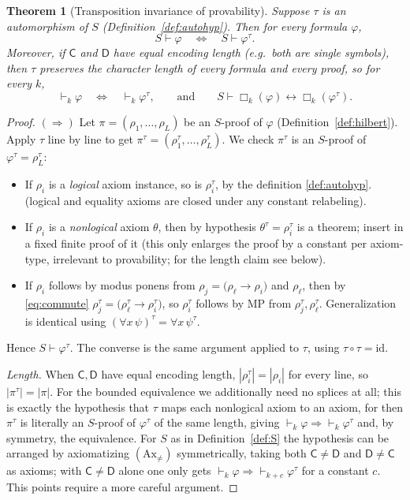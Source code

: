 \documentclass[11pt]{article}
\theoremstyle{definition}
\theoremstyle{plain}
\newtheorem{theorem}[definition]{Theorem}
\theoremstyle{remark}
\newcommand{\proves}{\vdash}
\newcommand{\bx}[1]{\Box_{#1}}
\newcommand{\Cact}{\mathsf{C}}
\newcommand{\Dact}{\mathsf{D}}
\newcommand{\tr}{\tau}
\begin{document}
\begin{theorem}[Transposition invariance of provability]\label{thm:auto}
Suppose $\tr$ is an automorphism of $S$ (Definition~\ref{def:autohyp}). Then for every formula $\varphi$,
\[
S\proves\varphi\quad\Longleftrightarrow\quad S\proves\varphi^{\tr}.
\]
Moreover, if $\Cact$ and $\Dact$ have equal encoding length (e.g.\ both are single symbols), then $\tr$ preserves the character length of every formula and every proof, so for every $k$,
\[
\vdash_k\varphi\quad\Longleftrightarrow\quad \vdash_k\varphi^{\tr},\qquad\text{and}\qquad S\proves\bx{k}(\varphi)\leftrightarrow\bx{k}(\varphi^{\tr}).
\]

\end{theorem}

\begin{proof}
$(\Rightarrow)$ Let $\pi=(\rho_1,\dots,\rho_L)$ be an $S$-proof of $\varphi$ (Definition~\ref{def:hilbert}). Apply $\tr$ line by line to get $\pi^{\tr}=(\rho_1^{\tr},\dots,\rho_L^{\tr})$. We check $\pi^{\tr}$ is an $S$-proof of $\varphi^{\tr}=\rho_L^{\tr}$:
\begin{itemize}[leftmargin=1.4em]
\item If $\rho_i$ is a \emph{logical} axiom instance, so is $\rho_i^{\tr}$, by the definition \ref{def:autohyp}. (logical and equality axioms are closed under any constant relabeling).
\item If $\rho_i$ is a \emph{nonlogical} axiom $\theta$, then by hypothesis $\theta^{\tr}=\rho_i^{\tr}$ is a theorem; insert in a fixed finite proof of it (this only enlarges the proof by a constant per axiom-type, irrelevant to provability; for the length claim see below).
\item If $\rho_i$ follows by modus ponens from $\rho_j=\big(\rho_\ell\to\rho_i\big)$ and $\rho_\ell$, then by \eqref{eq:commute} $\rho_j^{\tr}=\big(\rho_\ell^{\tr}\to\rho_i^{\tr}\big)$, so $\rho_i^{\tr}$ follows by MP from $\rho_j^{\tr},\rho_\ell^{\tr}$. Generalization is identical using $(\forall x\,\psi)^{\tr}=\forall x\,\psi^{\tr}$.
\end{itemize}
Hence $S\proves\varphi^{\tr}$. The converse is the same argument applied to $\tr$, using $\tr\circ\tr=\mathrm{id}$.



\emph{Length.} When $\mathsf{C},\mathsf{D}$ have equal encoding length,
$|\rho_i^{\tau}|=|\rho_i|$ for every line, so $|\pi^{\tau}|=|\pi|$. For the bounded
equivalence we additionally need no splices at all; this is exactly the hypothesis that
$\tau$ maps each nonlogical axiom to an axiom, for then $\pi^{\tau}$ is literally an
$S$-proof of $\varphi^{\tau}$ of the same length, giving
$\vdash_k\varphi\Rightarrow\vdash_k\varphi^{\tau}$ and, by symmetry, the equivalence. For
$S$ as in Definition~\ref{def:S} the hypothesis can be arranged by axiomatizing
$(\mathrm{Ax}_{\neq})$ symmetrically, taking both $\mathsf{C}\neq\mathsf{D}$ and
$\mathsf{D}\neq\mathsf{C}$ as axioms; with $\mathsf{C}\neq\mathsf{D}$ alone one only gets
$\vdash_k\varphi\Rightarrow\vdash_{k+c}\varphi^{\tau}$ for a constant $c$. This points require a more careful argument.
\end{proof}
\end{document}
